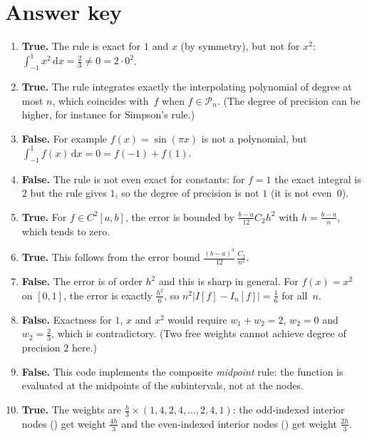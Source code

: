 \documentclass[a4paper]{article}
\renewcommand{\d}{\mathrm d}
\begin{document}
\section*{Answer key}
\begin{enumerate}[itemsep=8pt]
    \item \textbf{True.}
        The rule is exact for $1$ and $x$ (by symmetry), but not for $x^2$:
        $\int_{-1}^1 x^2 \, \d x = \frac{2}{3} \neq 0 = 2 \cdot 0^2$.

    \item \textbf{True.}
        The rule integrates exactly the interpolating polynomial of degree at most $n$,
        which coincides with~$f$ when $f \in \mathcal P_n$.
        (The degree of precision can be higher, for instance for Simpson's rule.)

    \item \textbf{False.}
        For example $f(x) = \sin(\pi x)$ is not a polynomial,
        but $\int_{-1}^1 f(x) \, \d x = 0 = f(-1) + f(1)$.

    \item \textbf{False.}
        The rule is not even exact for constants:
        for $f = 1$ the exact integral is $2$ but the rule gives $1$,
        so the degree of precision is not $1$ (it is not even~$0$).

    \item \textbf{True.}
        For $f \in C^2[a, b]$, the error is bounded by $\frac{b-a}{12} C_2 h^2$ with $h = \frac{b-a}{n}$,
        which tends to zero.

    \item \textbf{True.}
        This follows from the error bound $\frac{(b-a)^3}{12} \, \frac{C_2}{n^2}$.

    \item \textbf{False.}
        The error is of order $h^2$ and this is sharp in general.
        For $f(x) = x^2$ on $[0, 1]$, the error is exactly $\frac{h^2}{6}$,
        so $n^2 \lvert I[f] - I_n[f] \rvert = \frac{1}{6}$ for all~$n$.

    \item \textbf{False.}
        Exactness for $1$, $x$ and $x^2$ would require $w_1 + w_2 = 2$, $w_2 = 0$ and $w_2 = \frac{2}{3}$,
        which is contradictory.
        (Two free weights cannot achieve degree of precision $2$ here.)

    \item \textbf{False.}
        This code implements the composite \emph{midpoint} rule:
        the function is evaluated at the midpoints  of the subintervals,
        not at the nodes.

    \item \textbf{True.}
        The weights are $\frac{h}{3} \times (1, 4, 2, 4, \dotsc, 2, 4, 1)$:
        the odd-indexed interior nodes () get weight $\frac{4h}{3}$
        and the even-indexed interior nodes () get weight $\frac{2h}{3}$.
\end{enumerate}
\fi
\end{document}
